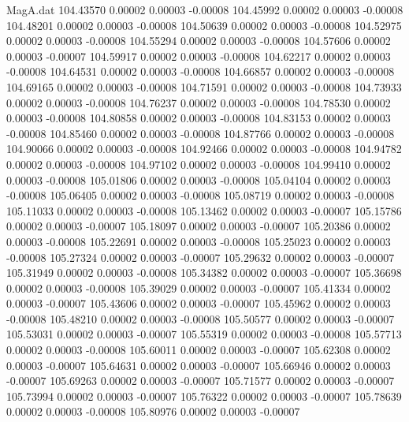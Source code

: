 \begin{filecontents}{MagA.dat}
 104.43570    0.00002    0.00003   -0.00008
 104.45992    0.00002    0.00003   -0.00008
 104.48201    0.00002    0.00003   -0.00008
 104.50639    0.00002    0.00003   -0.00008
 104.52975    0.00002    0.00003   -0.00008
 104.55294    0.00002    0.00003   -0.00008
 104.57606    0.00002    0.00003   -0.00007
 104.59917    0.00002    0.00003   -0.00008
 104.62217    0.00002    0.00003   -0.00008
 104.64531    0.00002    0.00003   -0.00008
 104.66857    0.00002    0.00003   -0.00008
 104.69165    0.00002    0.00003   -0.00008
 104.71591    0.00002    0.00003   -0.00008
 104.73933    0.00002    0.00003   -0.00008
 104.76237    0.00002    0.00003   -0.00008
 104.78530    0.00002    0.00003   -0.00008
 104.80858    0.00002    0.00003   -0.00008
 104.83153    0.00002    0.00003   -0.00008
 104.85460    0.00002    0.00003   -0.00008
 104.87766    0.00002    0.00003   -0.00008
 104.90066    0.00002    0.00003   -0.00008
 104.92466    0.00002    0.00003   -0.00008
 104.94782    0.00002    0.00003   -0.00008
 104.97102    0.00002    0.00003   -0.00008
 104.99410    0.00002    0.00003   -0.00008
 105.01806    0.00002    0.00003   -0.00008
 105.04104    0.00002    0.00003   -0.00008
 105.06405    0.00002    0.00003   -0.00008
 105.08719    0.00002    0.00003   -0.00008
 105.11033    0.00002    0.00003   -0.00008
 105.13462    0.00002    0.00003   -0.00007
 105.15786    0.00002    0.00003   -0.00007
 105.18097    0.00002    0.00003   -0.00007
 105.20386    0.00002    0.00003   -0.00008
 105.22691    0.00002    0.00003   -0.00008
 105.25023    0.00002    0.00003   -0.00008
 105.27324    0.00002    0.00003   -0.00007
 105.29632    0.00002    0.00003   -0.00007
 105.31949    0.00002    0.00003   -0.00008
 105.34382    0.00002    0.00003   -0.00007
 105.36698    0.00002    0.00003   -0.00008
 105.39029    0.00002    0.00003   -0.00007
 105.41334    0.00002    0.00003   -0.00007
 105.43606    0.00002    0.00003   -0.00007
 105.45962    0.00002    0.00003   -0.00008
 105.48210    0.00002    0.00003   -0.00008
 105.50577    0.00002    0.00003   -0.00007
 105.53031    0.00002    0.00003   -0.00007
 105.55319    0.00002    0.00003   -0.00008
 105.57713    0.00002    0.00003   -0.00008
 105.60011    0.00002    0.00003   -0.00007
 105.62308    0.00002    0.00003   -0.00007
 105.64631    0.00002    0.00003   -0.00007
 105.66946    0.00002    0.00003   -0.00007
 105.69263    0.00002    0.00003   -0.00007
 105.71577    0.00002    0.00003   -0.00007
 105.73994    0.00002    0.00003   -0.00007
 105.76322    0.00002    0.00003   -0.00007
 105.78639    0.00002    0.00003   -0.00008
 105.80976    0.00002    0.00003   -0.00007

\end{filecontents}
